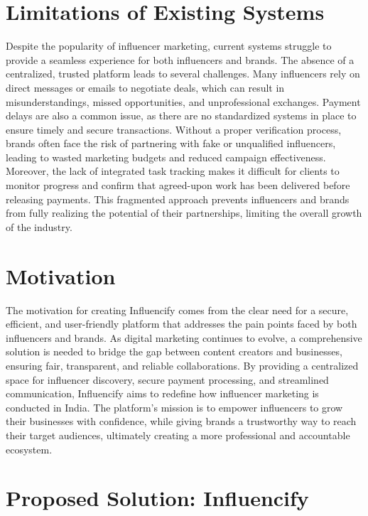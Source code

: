 \begin{justify}
\section{Limitations of Existing Systems}

Despite the popularity of influencer marketing, current systems struggle to provide a seamless experience for both influencers and brands. The absence of a centralized, trusted platform leads to several challenges. Many influencers rely on direct messages or emails to negotiate deals, which can result in misunderstandings, missed opportunities, and unprofessional exchanges. Payment delays are also a common issue, as there are no standardized systems in place to ensure timely and secure transactions. Without a proper verification process, brands often face the risk of partnering with fake or unqualified influencers, leading to wasted marketing budgets and reduced campaign effectiveness. Moreover, the lack of integrated task tracking makes it difficult for clients to monitor progress and confirm that agreed-upon work has been delivered before releasing payments. This fragmented approach prevents influencers and brands from fully realizing the potential of their partnerships, limiting the overall growth of the industry.

\section{Motivation}

The motivation for creating Influencify comes from the clear need for a secure, efficient, and user-friendly platform that addresses the pain points faced by both influencers and brands. As digital marketing continues to evolve, a comprehensive solution is needed to bridge the gap between content creators and businesses, ensuring fair, transparent, and reliable collaborations. By providing a centralized space for influencer discovery, secure payment processing, and streamlined communication, Influencify aims to redefine how influencer marketing is conducted in India. The platform’s mission is to empower influencers to grow their businesses with confidence, while giving brands a trustworthy way to reach their target audiences, ultimately creating a more professional and accountable ecosystem.

\section{Proposed Solution: Influencify}


\end{justify}
